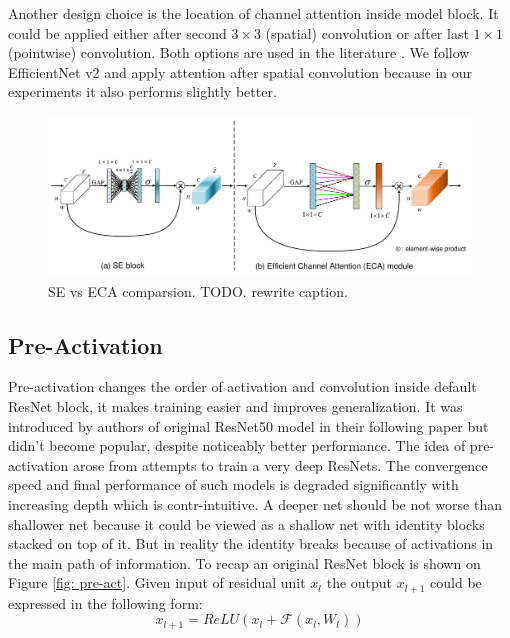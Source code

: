 Another design choice is the location of channel attention inside model block. It could be applied either after second $3 \times 3$ (spatial) convolution or after last $1 \times 1 $ (pointwise) convolution. Both options are used in the literature \cite{tan2019_efficientnet} \cite{tan2021_efficientnetv2} \cite{lin2020neural_genet}. We follow EfficientNet v2 \cite{tan2021_efficientnetv2} and apply attention after spatial convolution because in our experiments it also performs slightly better. %


\begin{figure}[h!]
  \caption{SE vs ECA comparsion. TODO. rewrite caption.}
  \label{fig: se-eca}
  \includegraphics[width=1\textwidth]{images/eca_module.png}
\end{figure}


\subsection{Pre-Activation}
Pre-activation changes the order of activation and convolution inside default ResNet block, it makes training easier and improves generalization. It was introduced by authors of original ResNet50 model \cite{he2016deep_resnetv1} in their following paper \cite{he2016identity_resnetv2} but didn't become popular, despite noticeably better performance. 
The idea of pre-activation arose from attempts to train a very deep ResNets. The convergence speed and final performance of such models is degraded significantly with increasing depth which is contr-intuitive. A deeper net should be not worse than shallower net because it could be viewed as a shallow net with identity blocks stacked on top of it. But in reality the identity breaks because of activations in the main path of information. To recap an original ResNet block is shown on Figure \ref{fig: pre-act}. Given input of residual unit $x_l$ the output $x_{l+1}$ could be expressed in the following form: 
$$ x_{l+1} = ReLU \left( x_l + \mathcal{F} (x_l, W_l) \right)$$ \label{eq: res-block}

